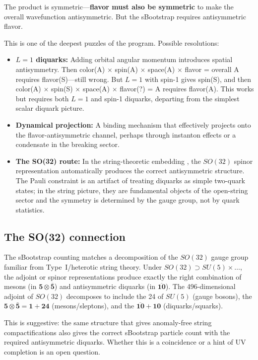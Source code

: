 \documentclass[12pt,a4paper]{article}
\begin{document}
The product is symmetric---\textbf{flavor must also be symmetric} 
to make the overall wavefunction antisymmetric. But the sBootstrap 
requires antisymmetric flavor.

This is one of the deepest puzzles of the program. Possible 
resolutions:
\begin{itemize}
\item \textbf{$L = 1$ diquarks:} Adding orbital angular momentum 
introduces spatial antisymmetry. Then color(A) $\times$ spin(A) 
$\times$ space(A) $\times$ flavor = overall A requires 
flavor(S)---still wrong. But $L=1$ with spin-1 gives spin(S), 
and then color(A) $\times$ spin(S) $\times$ space(A) $\times$ 
flavor(?) = A requires flavor(A). This works but requires both 
$L=1$ and spin-1 diquarks, departing from the simplest scalar 
diquark picture.
\item \textbf{Dynamical projection:} A binding mechanism that 
effectively projects onto the flavor-antisymmetric channel, perhaps 
through instanton effects or a condensate in the breaking sector.
\item \textbf{The SO(32) route:} In the string-theoretic embedding 
\cite{Rivero2005}, the $SO(32)$ spinor representation automatically 
produces the correct antisymmetric structure. The Pauli constraint 
is an artifact of treating diquarks as simple two-quark states; in 
the string picture, they are fundamental objects of the open-string 
sector and the symmetry is determined by the gauge group, not by 
quark statistics.
\end{itemize}

\subsection{The SO(32) connection}

The sBootstrap counting matches a decomposition of the $SO(32)$ gauge 
group familiar from Type~I/heterotic string theory. Under 
$SO(32) \supset SU(5) \times \ldots$, the adjoint or spinor 
representations produce exactly the right combination of mesons 
(in $\mathbf{5} \otimes \bar{\mathbf{5}}$) and antisymmetric 
diquarks (in $\overline{\mathbf{10}}$). The 496-dimensional adjoint 
of $SO(32)$ decomposes to include the 24 of $SU(5)$ (gauge bosons), 
the $\mathbf{5} \otimes \bar{\mathbf{5}} = \mathbf{1} + \mathbf{24}$ 
(mesons/sleptons), and the $\overline{\mathbf{10}} + \mathbf{10}$ 
(diquarks/squarks).

This is suggestive: the same structure that gives anomaly-free string 
compactifications also gives the correct sBootstrap particle count 
with the required antisymmetric diquarks. Whether this is a 
coincidence or a hint of UV completion is an open question.
\end{document}
